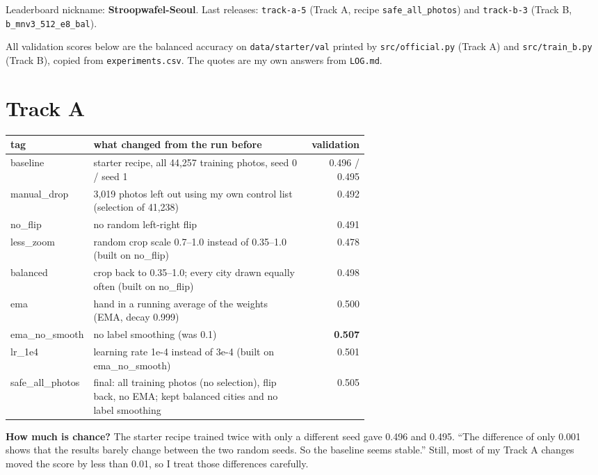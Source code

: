 \documentclass[11pt]{article}
\begin{document}
\makeheader

Leaderboard nickname: \textbf{Stroopwafel-Seoul}. Last releases:
\texttt{track-a-5} (Track A, recipe \texttt{safe\_all\_photos}) and
\texttt{track-b-3} (Track B, \texttt{b\_mnv3\_512\_e8\_bal}).

All validation scores below are the balanced accuracy on
\texttt{data/starter/val} printed by \texttt{src/official.py} (Track A) and
\texttt{src/train\_b.py} (Track B), copied from \texttt{experiments.csv}.
The quotes are my own answers from \texttt{LOG.md}.

\section*{Track A}

\begin{center}\footnotesize
\begin{tabular}{lp{0.6\linewidth}r}
\toprule
tag & what changed from the run before & validation \\
\midrule
baseline & starter recipe, all 44,257 training photos, seed 0 / seed 1 & 0.496 / 0.495 \\
manual\_drop & 3,019 photos left out using my own control list (selection of 41,238) & 0.492 \\
no\_flip & no random left-right flip & 0.491 \\
less\_zoom & random crop scale 0.7--1.0 instead of 0.35--1.0 (built on no\_flip) & 0.478 \\
balanced & crop back to 0.35--1.0; every city drawn equally often (built on no\_flip) & 0.498 \\
ema & hand in a running average of the weights (EMA, decay 0.999) & 0.500 \\
ema\_no\_smooth & no label smoothing (was 0.1) & \textbf{0.507} \\
lr\_1e4 & learning rate 1e-4 instead of 3e-4 (built on ema\_no\_smooth) & 0.501 \\
safe\_all\_photos & final: all training photos (no selection), flip back, no EMA; kept balanced cities and no label smoothing & 0.505 \\
\bottomrule
\end{tabular}
\end{center}

\textbf{How much is chance?} The starter recipe trained twice with only a
different seed gave 0.496 and 0.495. ``The difference of only 0.001 shows that
the results barely change between the two random seeds. So the baseline seems
stable.'' Still, most of my Track A changes moved the score by less than 0.01,
so I treat those differences carefully.
\end{document}
